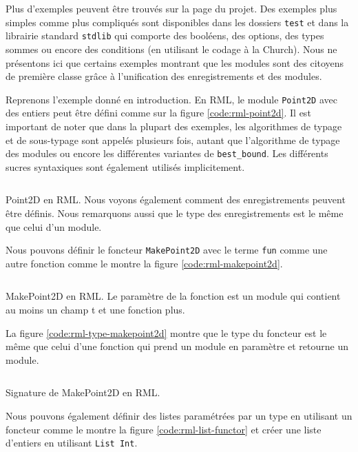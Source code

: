 Plus d'exemples peuvent être trouvés sur la page du projet. Des exemples plus
simples comme plus compliqués sont disponibles dans les dossiers \verb|test| et
dans la librairie standard \verb|stdlib| qui comporte des booléens, des options,
des types sommes ou encore des conditions (en utilisant le codage à la Church).
Nous ne présentons ici que certains exemples montrant que les modules sont des
citoyens de première classe grâce à l'unification des enregistrements et des modules.

Reprenons l'exemple donné en introduction. En RML, le module \verb|Point2D| avec
des entiers peut être défini comme sur la figure
\ref{code:rml-point2d}. Il est important de noter que dans la plupart des
exemples, les algorithmes de typage et de sous-typage sont appelés plusieurs
fois, autant que l'algorithme de typage des modules ou encore les différentes variantes
de \verb|best_bound|. Les différents sucres syntaxiques sont également utilisés
implicitement.

\begin{listing}
  \inputminted{OCaml}{codes/point2d.rml}
  \caption{Point2D en RML. Nous voyons également comment des enregistrements
    peuvent être définis. Nous remarquons aussi que le type des enregistrements
    est le même que celui d'un module.
  }
  \label{code:rml-point2d}
\end{listing}

Nous pouvons définir le foncteur \verb|MakePoint2D| avec le terme \verb|fun|
comme une autre fonction comme le montre la figure \ref{code:rml-makepoint2d}. 

\begin{listing}
  \inputminted{OCaml}{codes/makepoint2d.rml}
  \caption{MakePoint2D en RML. Le paramètre de la fonction est un module qui
    contient au moins un champ t et une fonction plus.}
  \label{code:rml-makepoint2d}
\end{listing}

La figure \ref{code:rml-type-makepoint2d} montre que le type du foncteur est le même
que celui d'une fonction qui prend un module en paramètre et retourne un module.

\begin{listing}
  \inputminted{OCaml}{codes/makepoint2d_sig.rml}
  \caption{Signature de MakePoint2D en RML.}
  \label{code:rml-type-makepoint2d}
\end{listing}

Nous pouvons également définir des listes paramétrées par un type en utilisant un foncteur
comme le montre la figure \ref{code:rml-list-functor} et créer une liste d'entiers en
utilisant \verb|List Int|.

